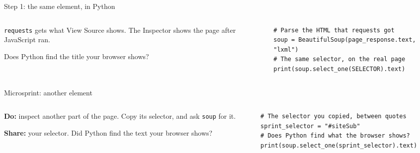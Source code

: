 \documentclass[9pt,aspectratio=169]{beamer}
\begin{document}
\begin{frame}[fragile]{Step 1: the same element, in Python}
    \begin{columns}[T]
        \begin{column}{0.37\textwidth}
            \texttt{requests} gets what View Source shows. The Inspector shows the page after JavaScript ran.

            \medskip
            Does Python find the title your browser shows?
        \end{column}
        \begin{column}{0.6\textwidth}
\begin{lstlisting}[style=lab]
# Parse the HTML that requests got
soup = BeautifulSoup(page_response.text, "lxml")
# The same selector, on the real page
print(soup.select_one(SELECTOR).text)
\end{lstlisting}
        \end{column}
    \end{columns}
\end{frame}

\begin{frame}[fragile]{Microsprint: another element}
    \begin{columns}[T]
        \begin{column}{0.37\textwidth}
            \textbf{Do:} inspect another part of the page. Copy its selector, and ask \texttt{soup} for it.

            \medskip
            \textbf{Share:} your selector. Did Python find the text your browser shows?
        \end{column}
        \begin{column}{0.6\textwidth}
\begin{lstlisting}[style=lab]
# The selector you copied, between quotes
sprint_selector = "#siteSub"
# Does Python find what the browser shows?
print(soup.select_one(sprint_selector).text)
\end{lstlisting}
        \end{column}
    \end{columns}
\end{frame}
\end{document}
